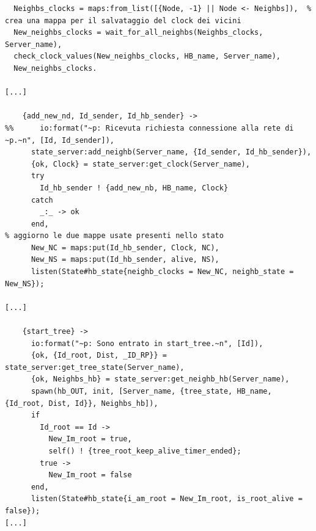 \documentclass[italian]{memoir}
\begin{document}
\begin{verbatim}
  Neighbs_clocks = maps:from_list([{Node, -1} || Node <- Neighbs]),  % crea una mappa per il salvataggio del clock dei vicini
  New_neighbs_clocks = wait_for_all_neighbs(Neighbs_clocks, Server_name),
  check_clock_values(New_neighbs_clocks, HB_name, Server_name),
  New_neighbs_clocks.

[...]

    {add_new_nd, Id_sender, Id_hb_sender} ->
%%      io:format("~p: Ricevuta richiesta connessione alla rete di ~p.~n", [Id, Id_sender]),
      state_server:add_neighb(Server_name, {Id_sender, Id_hb_sender}),
      {ok, Clock} = state_server:get_clock(Server_name),
      try
        Id_hb_sender ! {add_new_nb, HB_name, Clock}
      catch
        _:_ -> ok
      end,
% aggiorno le due mappe usate presenti nello stato
      New_NC = maps:put(Id_hb_sender, Clock, NC),
      New_NS = maps:put(Id_hb_sender, alive, NS),
      listen(State#hb_state{neighb_clocks = New_NC, neighb_state = New_NS});

[...]

    {start_tree} ->
      io:format("~p: Sono entrato in start_tree.~n", [Id]),
      {ok, {Id_root, Dist, _ID_RP}} = state_server:get_tree_state(Server_name),
      {ok, Neighbs_hb} = state_server:get_neighb_hb(Server_name),
      spawn(hb_OUT, init, [Server_name, {tree_state, HB_name, {Id_root, Dist, Id}}, Neighbs_hb]),
      if
        Id_root == Id ->
          New_Im_root = true,
          self() ! {tree_root_keep_alive_timer_ended};
        true ->
          New_Im_root = false
      end,
      listen(State#hb_state{i_am_root = New_Im_root, is_root_alive = false});
[...]


\end{verbatim}
\end{document}
